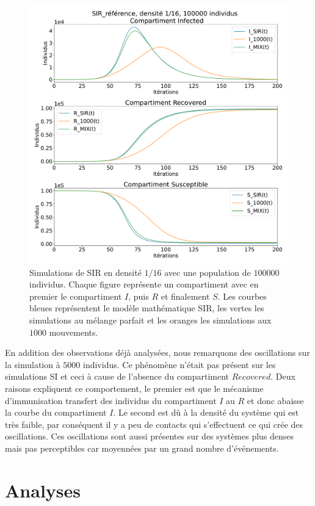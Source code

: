 \newpage

\begin{figure}[h]
	\centering
	\captionsetup{justification=centering}
	\includegraphics[width=.8\textwidth]{Images/SIR_ref_16_100.pdf}
	\caption[Simulation SIR, densité $1/16$]{Simulations de SIR en densité $1/16$ avec une population de $100000$ individus. Chaque figure représente un compartiment avec en premier le compartiment $I$, puis $R$ et finalement $S$. Les courbes bleues représentent le modèle mathématique SIR, les vertes les simulations au mélange parfait et les oranges les simulations aux $1000$ mouvements.}
\end{figure}

En addition des observations déjà analysées, nous remarquons des oscillations sur la simulation à $5000$ individus. Ce phénomène n'était pas présent sur les simulations SI et ceci à cause de l'absence du compartiment $Recovered$. Deux raisons expliquent ce comportement, le premier est que le mécanisme d'immunisation transfert des individus du compartiment $I$ au $R$ et donc abaisse la courbe du compartiment $I$. Le second est dû à la densité du système qui est très faible, par conséquent il y a peu de contacts qui s'effectuent ce qui crée des oscillations. Ces oscillations sont aussi présentes sur des systèmes plus denses mais pas perceptibles car moyennées par un grand nombre d'événements.

\newpage

\section{Analyses}

